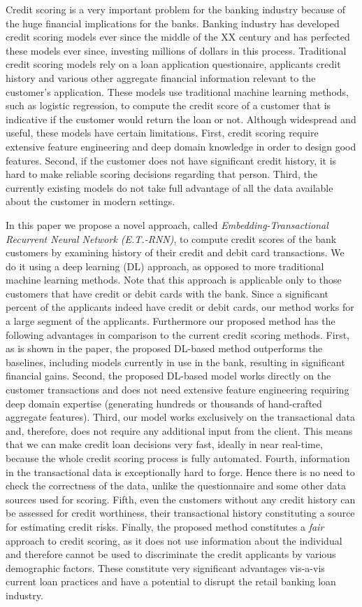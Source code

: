 \documentclass[sigconf]{acmart}
\begin{document}
Credit scoring is a very important problem for the banking industry because of the huge financial implications for the banks. Banking industry has developed credit scoring models ever since the middle of the XX century  and has perfected these models ever since, investing millions of dollars in this process. Traditional credit scoring models rely on a loan application questionaire, applicants credit history and various other aggregate financial information relevant to the customer's application. These models use traditional machine learning methods, such as logistic regression, to compute the credit score of a customer that is indicative if the customer would return the loan or not. Although widespread and useful, these models have certain limitations. First, credit scoring require extensive feature engineering and deep domain knowledge in order to design good features.
Second, if the customer does not have significant credit history, it is hard to make reliable scoring decisions regarding that person. Third, the currently existing models do not take full advantage of all the data available about the customer in modern settings.

In this paper we propose a novel approach, called \textit{Embedding-Transactional Recurrent Neural Network (E.T.-RNN)}, to compute credit scores of the bank customers by examining history of their credit and debit card transactions.
We do it using a deep learning (DL) approach, as opposed to more traditional machine learning methods.
Note that this approach is applicable only to those customers that have credit or debit cards with the bank. Since a significant percent of the applicants indeed have credit or debit cards, our method works for a large segment of the applicants. Furthermore our proposed method has the following advantages in comparison to the current credit scoring methods.
First, as is shown in the paper, the proposed DL-based method outperforms the baselines, including models currently in use in the bank, resulting in significant financial gains.
Second, the proposed DL-based model works directly on the customer transactions and does not need extensive feature engineering requiring deep domain expertise (generating hundreds or thousands of hand-crafted aggregate features).
Third, our model works exclusively on the transactional data and, therefore, does not require any additional input from the client. This means that we can make credit loan decisions very fast, ideally in near real-time, because the whole credit scoring process is fully automated.
Fourth, information in the transactional data is exceptionally hard to forge. Hence there is no need to check the correctness of the data, unlike the questionnaire and some other data sources used for scoring.
Fifth, even the customers without any credit history can be assessed for credit worthiness, their transactional history constituting a source for estimating credit risks.
Finally, the proposed method  constitutes a \textit{fair} approach to credit scoring, as it does not use information about the individual and therefore cannot be used to discriminate the credit applicants by various demographic factors.
These constitute very significant advantages vis-a-vis current loan practices and have a potential to disrupt the retail banking loan industry.
\end{document}

